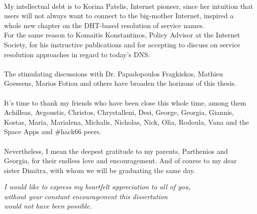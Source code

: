 \paragraph{}
My intellectual debt is to Korina Patelis, Internet pioneer, since her intuition that users will not always want to connect to the big-mother Internet, inspired a whole new chapter on the DHT-based resolution of service names.\\
\indent For the same reason to Komaitis Konstantinos, Policy Advisor at the Internet Society, for his instructive publications and for accepting to discuss on service resolution approaches in regard to today's DNS.

\paragraph{}
The stimulating discussions with Dr. Papadopoulos Fragkiskos, Mathieu Goessens, Marios Fotiou and others have broaden the horizons of this thesis.

\paragraph{}
It's time to thank my friends who have been close this whole time, among them Achilleas, Avgoustis, Christos, Chrystalleni, Desi, George, Georgia, Giannis, Kostas, Maria, Marialena, Michalis, Nicholas, Nick, Olia, Rodoula, Vana and the Space Apps and \#hack66 peers.

\paragraph{}
Nevertheless, I mean the deepest gratitude to my parents, Parthenios and Georgia, for their endless love and encouragement. And of course to my dear sister Dimitra, with whom we will be graduating the same day.\\[0.8cm]


\begin{flushright}
\emph{I would like to express my heartfelt appreciation to all of you,\\
without your constant encouragement this dissertation\\
would not have been possible.}
\end{flushright}